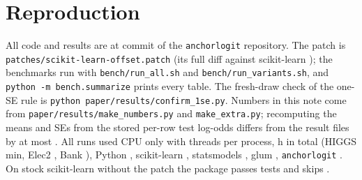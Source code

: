 \documentclass{article}
\newcommand{\code}[1]{\texttt{#1}}
\begin{document}
\privateLine{}

\section{Reproduction}
\label{app:repro}

All code and results are at commit \code{\nCommit} of the \code{anchorlogit} repository. The patch is \code{patches/scikit-learn-offset.patch} (its full diff against scikit-learn \nVerSklearn); the benchmarks run with \code{bench/run\_all.sh} and \code{bench/run\_variants.sh}, and \code{python -m bench.summarize} prints every table.
The fresh-draw check of the one-SE rule is \code{python paper/results/confirm\_1se.py}. Numbers in this note come from \code{paper/results/make\_numbers.py} and \code{make\_extra.py}; recomputing the means and SEs from the stored per-row test log-odds differs from the result files by at most \nRecomputeMaxDiff.
All runs used CPU only with \nThreads{} threads per process, \nComputeHours{} h in total (HIGGS \nHgRuntimeMin{} min, Elec2 \nElRuntimeMin, Bank \nBkRuntimeMin), Python \nVerPython, scikit-learn \nVerSklearn, statsmodels \nVerStatsmodels, glum \nVerGlum, \code{anchorlogit} \nVerAnchorlogit.
On stock scikit-learn without the patch the package passes \nPkgTestsStockPass{} tests and skips \nPkgTestsStockSkip.
\end{document}
